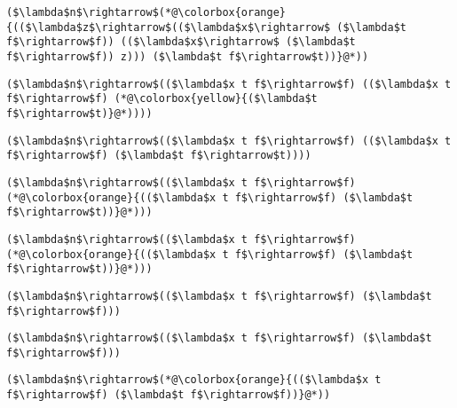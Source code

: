 \documentclass{beamer}
\begin{document}
\begin{frame}[fragile]{\CurrentSection}
\lstset{basicstyle=\ttfamily\small}\lstset{numbers=none}\lstset{language=ML}\begin{lstlisting}
($\lambda$n$\rightarrow$(*@\colorbox{orange}{(($\lambda$z$\rightarrow$(($\lambda$x$\rightarrow$ ($\lambda$t f$\rightarrow$f)) (($\lambda$x$\rightarrow$ ($\lambda$t f$\rightarrow$f)) z))) ($\lambda$t f$\rightarrow$t))}@*))
\end{lstlisting}
\pause\lstset{language=ML}\begin{lstlisting}
($\lambda$n$\rightarrow$(($\lambda$x t f$\rightarrow$f) (($\lambda$x t f$\rightarrow$f) (*@\colorbox{yellow}{($\lambda$t f$\rightarrow$t)}@*))))
\end{lstlisting}

\end{frame}

\begin{frame}[fragile]{\CurrentSection}
\lstset{basicstyle=\ttfamily\small}\lstset{numbers=none}\lstset{language=ML}\begin{lstlisting}
($\lambda$n$\rightarrow$(($\lambda$x t f$\rightarrow$f) (($\lambda$x t f$\rightarrow$f) ($\lambda$t f$\rightarrow$t))))
\end{lstlisting}
\pause\lstset{language=ML}\begin{lstlisting}
($\lambda$n$\rightarrow$(($\lambda$x t f$\rightarrow$f) (*@\colorbox{orange}{(($\lambda$x t f$\rightarrow$f) ($\lambda$t f$\rightarrow$t))}@*)))
\end{lstlisting}

\end{frame}

\begin{frame}[fragile]{\CurrentSection}
\lstset{basicstyle=\ttfamily\small}\lstset{numbers=none}\lstset{language=ML}\begin{lstlisting}
($\lambda$n$\rightarrow$(($\lambda$x t f$\rightarrow$f) (*@\colorbox{orange}{(($\lambda$x t f$\rightarrow$f) ($\lambda$t f$\rightarrow$t))}@*)))
\end{lstlisting}
\pause\lstset{language=ML}\begin{lstlisting}
($\lambda$n$\rightarrow$(($\lambda$x t f$\rightarrow$f) ($\lambda$t f$\rightarrow$f)))
\end{lstlisting}

\end{frame}

\begin{frame}[fragile]{\CurrentSection}
\lstset{basicstyle=\ttfamily\small}\lstset{numbers=none}\lstset{language=ML}\begin{lstlisting}
($\lambda$n$\rightarrow$(($\lambda$x t f$\rightarrow$f) ($\lambda$t f$\rightarrow$f)))
\end{lstlisting}
\pause\lstset{language=ML}\begin{lstlisting}
($\lambda$n$\rightarrow$(*@\colorbox{orange}{(($\lambda$x t f$\rightarrow$f) ($\lambda$t f$\rightarrow$f))}@*))
\end{lstlisting}

\end{frame}
\end{document}
